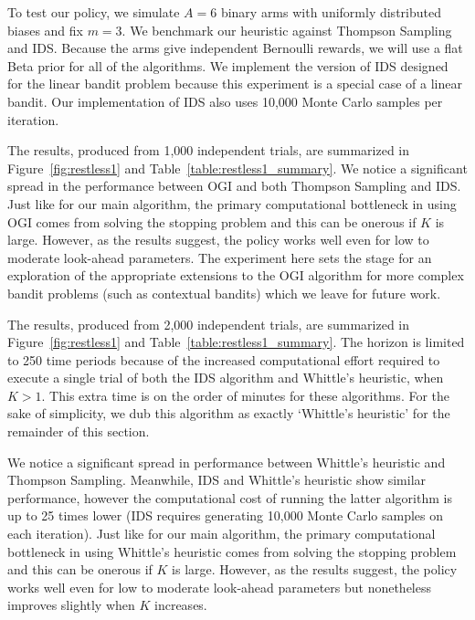 To test our policy, we simulate $A = 6$ binary arms with uniformly distributed biases and fix $m=3$. 
We benchmark our heuristic against Thompson Sampling and IDS. Because the arms give independent Bernoulli rewards, we will use a flat Beta prior for all of the algorithms. We implement the version of IDS designed for the linear bandit problem because this experiment is a special case of a linear bandit. Our implementation of IDS also uses {\color{blue} 10,000 Monte Carlo} samples per iteration.

The results, produced from 1,000 independent trials, are summarized in Figure~\ref{fig:restless1} and Table~\ref{table:restless1_summary}. We notice a significant spread in the performance between OGI and both Thompson Sampling and IDS. Just like for our main algorithm, the primary computational bottleneck in using OGI comes from solving the stopping problem and this can be onerous if $K$ is large. However, as the results suggest, the policy works well even for low to moderate look-ahead parameters. The experiment here sets the stage for an exploration of the appropriate extensions to the OGI algorithm for more complex bandit problems (such as contextual bandits) which we leave for future work. 

The results, produced from 2,000 independent trials, are summarized in Figure~\ref{fig:restless1} and Table~\ref{table:restless1_summary}. The horizon is limited to 250 time periods because of the increased computational effort required to execute a single trial of both the IDS algorithm and Whittle's heuristic, when $K > 1$. This extra time is on the order of minutes for these algorithms.
For the sake of simplicity, we dub this algorithm as exactly `Whittle's heuristic' for the remainder of this section.

{\color{blue}We notice a significant spread in performance between Whittle's heuristic and Thompson Sampling. Meanwhile, IDS and Whittle's heuristic show similar performance, however the computational cost of running the latter algorithm is up to 25 times lower (IDS requires generating 10,000 Monte Carlo samples on each iteration). Just like for our main algorithm, the primary computational bottleneck in using Whittle's heuristic comes from solving the stopping problem and this can be onerous if $K$ is large. However, as the results suggest, the policy works well even for low to moderate look-ahead parameters but nonetheless improves slightly when $K$ increases.%
}

